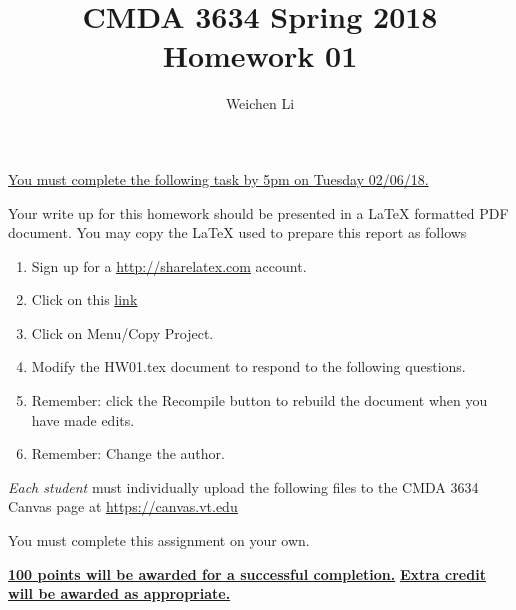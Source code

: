 \documentclass{article}
\newcommand{\pad}{\vspace{8pt}\noindent}
\newcommand{\myhref}[2]{\href{#1}{\color{foo}\underline{#2}\color{black}}}
\begin{document}
\title{CMDA 3634 Spring 2018 Homework 01}

\author{Weichen Li}
\vspace{-64pt}\maketitle
\begin{center}\underline{You must complete the following task by 5pm on Tuesday 02/06/18.}\end{center}
Your write up for this homework should be presented in a {\LaTeX} formatted PDF document. You may copy the \LaTeX{} used to prepare this report as follows

\begin{enumerate}
\item Sign up for a \myhref{http://sharelatex.com}{http://sharelatex.com} account.
\item Click on this  \myhref{https://www.sharelatex.com/read/jgjxnrcskhbc}{link} 
\item Click on Menu/Copy Project.
\item Modify the HW01.tex document to respond to the following questions. 
\item Remember: click the Recompile button to rebuild the document when you have made edits.
\item Remember: Change the author. 

\end{enumerate}

\pad \emph{Each student} must individually upload the following files to the CMDA 3634 Canvas page at \myhref{https://canvas.vt.edu}{https://canvas.vt.edu}


\pad You must complete this assignment on your own.

\vspace{16pt}
\begin{center}
\underline{\bf 100 points will be awarded for a successful completion.}
\vspace{8pt}\underline{\bf Extra credit will be awarded as appropriate.}
\end{center}
\end{document}
